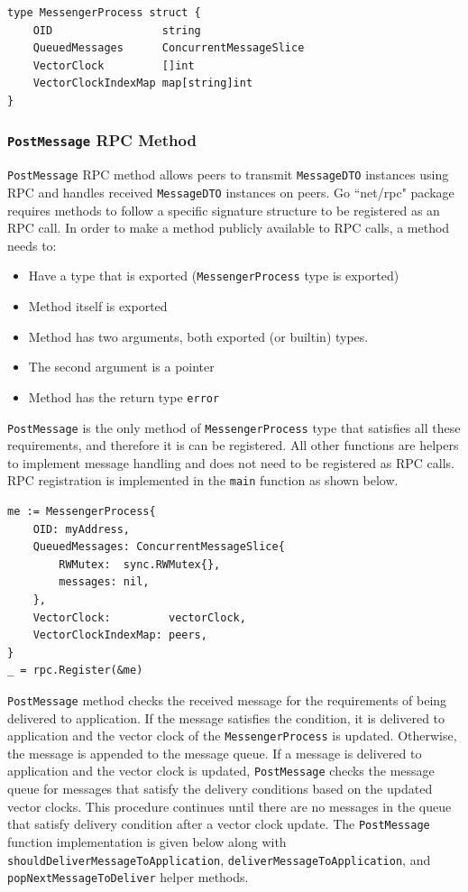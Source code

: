 \documentclass[a4paper]{article}
\begin{document}
\begin{lstlisting}[caption={\texttt{MessengerProcess} Struct}]
type MessengerProcess struct {
    OID                 string
    QueuedMessages      ConcurrentMessageSlice
    VectorClock         []int
    VectorClockIndexMap map[string]int
}
\end{lstlisting}

\subsubsection{\texttt{PostMessage} RPC Method}

\texttt{PostMessage} RPC method allows peers to transmit \texttt{MessageDTO} instances using RPC and handles received \texttt{MessageDTO} instances on peers. Go ``net/rpc" package requires methods to follow a specific signature structure to be registered as an RPC call. In order to make a method publicly available to RPC calls, a method needs to:
\begin{itemize}
    \item Have a type that is exported (\texttt{MessengerProcess} type is exported)
    \item Method itself is exported
    \item Method has two arguments, both exported (or builtin) types.
    \item The second argument is a pointer
    \item Method has the return type \texttt{error}
\end{itemize}

\noindent \texttt{PostMessage} is the only method of \texttt{MessengerProcess} type that satisfies all these requirements, and therefore it is can be registered. All other functions are helpers to implement message handling and does not need to be registered as RPC calls. RPC registration is implemented in the \texttt{main} function as shown below.

\begin{lstlisting}[caption={RPC call registration}]
me := MessengerProcess{
    OID: myAddress,
    QueuedMessages: ConcurrentMessageSlice{
        RWMutex:  sync.RWMutex{},
        messages: nil,
    },
    VectorClock:         vectorClock,
    VectorClockIndexMap: peers,
}
_ = rpc.Register(&me)
\end{lstlisting}

\noindent \texttt{PostMessage} method checks the received message for the requirements of being delivered to application. If the message satisfies the condition, it is delivered to application and the vector clock of the \texttt{MessengerProcess} is updated. Otherwise, the message is appended to the message queue. If a message is delivered to application and the vector clock is updated, \texttt{PostMessage} checks the message queue for messages that satisfy the delivery conditions based on the updated vector clocks. This procedure continues until there are no messages in the queue that satisfy delivery condition after a vector clock update. The \texttt{PostMessage} function implementation is given below along with \texttt{shouldDeliverMessageToApplication}, \texttt{deliverMessageToApplication}, and \texttt{popNextMessageToDeliver} helper methods.
\end{document}
